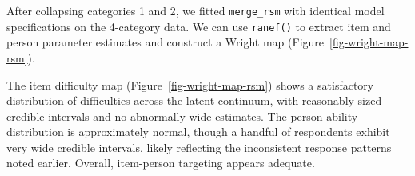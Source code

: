 \documentclass[
  man,
  floatsintext,
  longtable,
  nolmodern,
  notxfonts,
  notimes,
  colorlinks=true,linkcolor=blue,citecolor=blue,urlcolor=blue]{apa7}
\newenvironment{Shaded}{\begin{snugshade}}{\end{snugshade}}
\newcommand{\AttributeTok}[1]{\textcolor[rgb]{0.40,0.45,0.13}{#1}}
\newcommand{\FloatTok}[1]{\textcolor[rgb]{0.68,0.00,0.00}{#1}}
\newcommand{\FunctionTok}[1]{\textcolor[rgb]{0.28,0.35,0.67}{#1}}
\newcommand{\NormalTok}[1]{\textcolor[rgb]{0.00,0.23,0.31}{#1}}
\newcommand{\OtherTok}[1]{\textcolor[rgb]{0.00,0.23,0.31}{#1}}
\newcommand{\SpecialCharTok}[1]{\textcolor[rgb]{0.37,0.37,0.37}{#1}}
\newcommand{\StringTok}[1]{\textcolor[rgb]{0.13,0.47,0.30}{#1}}
\begin{document}
After collapsing categories 1 and 2, we fitted \texttt{merge\_rsm} with
identical model specifications on the 4-category data. We can use
\texttt{ranef()} to extract item and person parameter estimates and
construct a Wright map (Figure~\ref{fig-wright-map-rsm}).

\begin{Shaded}
\end{Shaded}

The item difficulty map (Figure~\ref{fig-wright-map-rsm}) shows a
satisfactory distribution of difficulties across the latent continuum,
with reasonably sized credible intervals and no abnormally wide
estimates. The person ability distribution is approximately normal,
though a handful of respondents exhibit very wide credible intervals,
likely reflecting the inconsistent response patterns noted earlier.
Overall, item-person targeting appears adequate.
\end{document}
